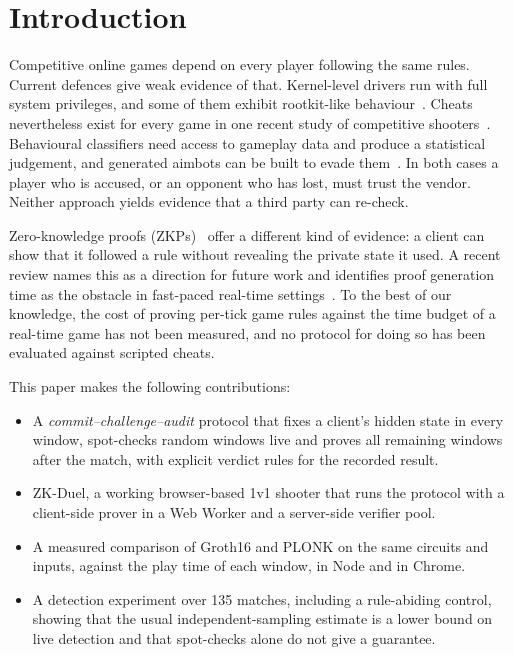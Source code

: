 \documentclass[conference]{IEEEtran}
\begin{document}
\section{Introduction}

Competitive online games depend on every player following the same rules.
Current defences give weak evidence of that.
Kernel-level drivers run with full system privileges, and some of them exhibit rootkit-like behaviour~\cite{dorner2024}.
Cheats nevertheless exist for every game in one recent study of competitive shooters~\cite{collins2024}.
Behavioural classifiers need access to gameplay data and produce a statistical judgement, and generated aimbots can be built to evade them~\cite{kanervisto2023}.
In both cases a player who is accused, or an opponent who has lost, must trust the vendor.
Neither approach yields evidence that a third party can re-check.

Zero-knowledge proofs (ZKPs)~\cite{gmr1989} offer a different kind of evidence: a client can show that it followed a rule without revealing the private state it used.
A recent review names this as a direction for future work and identifies proof generation time as the obstacle in fast-paced real-time settings~\cite{kapur2026}.
To the best of our knowledge, the cost of proving per-tick game rules against the time budget of a real-time game has not been measured, and no protocol for doing so has been evaluated against scripted cheats.

This paper makes the following contributions:
\begin{itemize}
\item A \emph{commit--challenge--audit} protocol that fixes a client's hidden state in every window, spot-checks random windows live and proves all remaining windows after the match, with explicit verdict rules for the recorded result.
\item ZK-Duel, a working browser-based 1v1 shooter that runs the protocol with a client-side prover in a Web Worker and a server-side verifier pool.
\item A measured comparison of Groth16 and PLONK on the same circuits and inputs, against the play time of each window, in Node and in Chrome.
\item A detection experiment over 135 matches, including a rule-abiding control, showing that the usual independent-sampling estimate is a lower bound on live detection and that spot-checks alone do not give a guarantee. %
\end{itemize}
\end{document}
